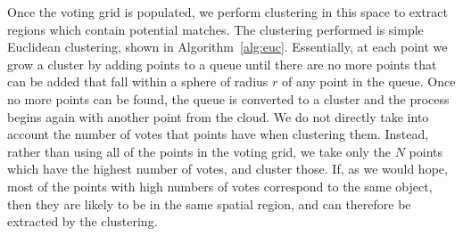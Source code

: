 \documentclass[11pt,a4paper]{kth-mag}
\begin{document}
Once the voting grid is populated, we perform clustering in this space to
extract regions which contain potential matches. The clustering performed is
simple Euclidean clustering, shown in Algorithm~\ref{alg:euc}. Essentially, at
each point we grow a cluster by adding points to a queue until there are no more
points that can be added that fall within a sphere of radius $r$ of any point in
the queue. Once no more points can be found, the queue is converted to a cluster
and the process begins again with another point from the cloud. We do not
directly take into account the number of votes that points have when clustering
them. Instead, rather than using all of the points in the voting grid, we take
only the $N$ points which have the highest number of votes, and cluster those.
If, as we would hope, most of the points with high numbers of votes correspond
to the same object, then they are likely to be in the same spatial region, and
can therefore be extracted by the clustering.
\end{document}
